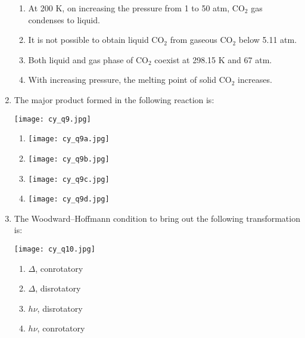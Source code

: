 \documentclass[12pt]{article}
\begin{document}
\begin{enumerate}[label=Q.\arabic*]
		\begin{enumerate}[label=(\Alph*)]
		\item At 200 K, on increasing the pressure from 1 to 50 atm, CO$_2$ gas condenses to liquid.
		\item It is not possible to obtain liquid CO$_2$ from gaseous CO$_2$ below 5.11 atm.
		\item Both liquid and gas phase of CO$_2$ coexist at 298.15 K and 67 atm.
		\item With increasing pressure, the melting point of solid CO$_2$ increases.
		\end{enumerate}
		\item The major product formed in the following reaction is:
		\begin{center}
		\texttt{[image: cy\_q9.jpg]}
		\end{center}
		\begin{multicols}{4}
		\begin{enumerate}[label=(\Alph*)]
		\item \texttt{[image: cy\_q9a.jpg]}
		\item \texttt{[image: cy\_q9b.jpg]}
		\item \texttt{[image: cy\_q9c.jpg]}
		\item \texttt{[image: cy\_q9d.jpg]}
		\end{enumerate}
		\end{multicols}
		\item The Woodward–Hoffmann condition to bring out the following transformation is:
		\begin{center}
		\texttt{[image: cy\_q10.jpg]}
		\end{center}

		\begin{enumerate}[label=(\Alph*)]
		\item $\Delta$, conrotatory
		\item $\Delta$, disrotatory
		\item $h\nu$, disrotatory
		\item $h\nu$, conrotatory
		\end{enumerate}


\end{enumerate}
\end{document}
